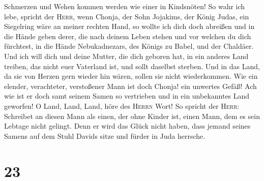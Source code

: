 Schmerzen und Wehen kommen werden wie einer in Kindsnöten!
 So wahr ich lebe, spricht der \textsc{Herr}, wenn
Chonja, der Sohn Jojakims, der König Judas, ein Siegelring wäre an
meiner rechten Hand, so wollte ich dich doch abreißen 
und in die Hände geben derer, die nach deinem Leben stehen und vor
welchen du dich fürchtest, in die Hände Nebukadnezars, des Königs zu
Babel, und der Chaldäer.  Und ich will dich und deine
Mutter, die dich geboren hat, in ein anderes Land treiben, das nicht
euer Vaterland ist, und sollt daselbst sterben.  Und in
das Land, da sie von Herzen gern wieder hin wären, sollen sie nicht
wiederkommen.  Wie ein elender, verachteter, verstoßener
Mann ist doch Chonja! ein unwertes Gefäß! Ach wie ist er doch samt
seinem Samen so vertrieben und in ein unbekanntes Land geworfen!
 O Land, Land, Land, höre des \textsc{Herrn} Wort!
 So spricht der \textsc{Herr}: Schreibet an diesen Mann
als einen, der ohne Kinder ist, einen Mann, dem es sein Lebtage nicht
gelingt. Denn er wird das Glück nicht haben, dass jemand seines Samens
auf dem Stuhl Davids sitze und fürder in Juda herrsche.

\hypertarget{section-22}{%
\section{23}\label{section-22}}

